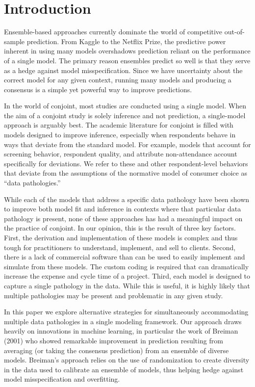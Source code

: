 \documentclass[12pt,titlepage]{mktg-article}
\begin{document}
\newpage
\hypertarget{introduction}{%
\section{Introduction}\label{introduction}}

Ensemble-based approaches currently dominate the world of competitive out-of-sample prediction. From Kaggle to the Netflix Prize, the predictive power inherent in using many models overshadows prediction reliant on the performance of a single model. The primary reason ensembles predict so well is that they serve as a hedge against model misspecification. Since we have uncertainty about the correct model for any given context, running many models and producing a consensus is a simple yet powerful way to improve predictions.

In the world of conjoint, most studies are conducted using a single model. When the aim of a conjoint study is solely inference and not prediction, a single-model approach is arguably best. The academic literature for conjoint is filled with models designed to improve inference, especially when respondents behave in ways that deviate from the standard model. For example, models that account for screening behavior, respondent quality, and attribute non-attendance account specifically for deviations. We refer to these and other respondent-level behaviors that deviate from the assumptions of the normative model of consumer choice as ``data pathologies.''

While each of the models that address a specific data pathology have been shown to improve both model fit and inference in contexts where that particular data pathology is present, none of these approaches has had a meaningful impact on the practice of conjoint. In our opinion, this is the result of three key factors. First, the derivation and implementation of these models is complex and thus tough for practitioners to understand, implement, and sell to clients. Second, there is a lack of commercial software than can be used to easily implement and simulate from these models. The custom coding is required that can dramatically increase the expense and cycle time of a project. Third, each model is designed to capture a single pathology in the data. While this is useful, it is highly likely that multiple pathologies may be present and problematic in any given study.

In this paper we explore alternative strategies for simultaneously accommodating multiple data pathologies in a single modeling framework. Our approach draws heavily on innovations in machine learning, in particular the work of Breiman (2001) who showed remarkable improvement in prediction resulting from averaging (or taking the consensus prediction) from an ensemble of diverse models. Breiman's approach relies on the use of randomization to create diversity in the data used to calibrate an ensemble of models, thus helping hedge against model misspecification and overfitting.
\end{document}
